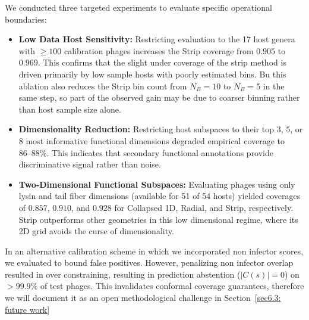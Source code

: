We conducted three targeted experiments to evaluate specific operational boundaries:
\begin{itemize}
     \item \textbf{Low Data Host Sensitivity:} Restricting evaluation to the 17 host genera with $\ge 100$ calibration phages 
           increases the Strip coverage from $0.905$ to $0.969$. This confirms that the slight under coverage of the strip method 
           is driven primarily by low sample hosts with poorly estimated bins. Bu this ablation also reduces the Strip bin count 
           from $N_B = 10$ to $N_B = 5$ in the same step, so part of the observed gain may be due to coarser binning rather than 
           host sample size alone.
    
     \item \textbf{Dimensionality Reduction:} Restricting host subspaces to their top $3$, $5$, or $8$ most informative functional 
           dimensions degraded empirical coverage to $86\text{--}88\%$. This indicates that secondary functional annotations provide 
           discriminative signal rather than noise.
    \item \textbf{Two-Dimensional Functional Subspaces:} Evaluating phages using only lysin and tail fiber dimensions (available for 
           51 of 54 hosts) yielded coverages of $0.857$, $0.910$, and $0.928$ for Collapsed 1D, Radial, and Strip, respectively. 
           Strip outperforms other geometries in this low dimensional regime, where its 2D grid avoids the curse of dimensionality.
\end{itemize}


In an alternative calibration scheme in which we incorporated non infector scores, we evaluated to bound false positives. 
However, penalizing non infector overlap resulted in over constraining, resulting in prediction abstention 
($\vert{}C(s)\vert{} = 0$) on $>99.9\%$ of test phages. This invalidates conformal coverage guarantees, therefore we will 
document it as an open methodological challenge in Section~\ref{sec6.3: future work}